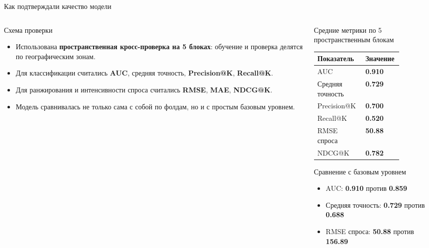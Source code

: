 \documentclass[aspectratio=169,12pt]{beamer}
\begin{document}
\begin{frame}[shrink=4]{Как подтверждали качество модели}
\footnotesize
\begin{columns}[T]
\begin{column}{0.54\textwidth}
\begin{block}{Схема проверки}
\begin{itemize}
\item Использована \textbf{пространственная кросс-проверка на 5 блоках}: обучение и проверка делятся по географическим зонам.
\item Для классификации считались \textbf{AUC}, средняя точность, \textbf{Precision@K}, \textbf{Recall@K}.
\item Для ранжирования и интенсивности спроса считались \textbf{RMSE}, \textbf{MAE}, \textbf{NDCG@K}.
\item Модель сравнивалась не только сама с собой по фолдам, но и с простым базовым уровнем.
\end{itemize}
\end{block}

\end{column}

\begin{column}{0.46\textwidth}
\begin{block}{Средние метрики по 5 пространственным блокам}
\centering
\begin{tabular}{>{\raggedright\arraybackslash}p{0.52\linewidth} >{\centering\arraybackslash}p{0.20\linewidth}}
\toprule
Показатель & Значение \\
\midrule
AUC & \textbf{0.910} \\
Средняя точность & \textbf{0.729} \\
Precision@K & \textbf{0.700} \\
Recall@K & \textbf{0.520} \\
RMSE спроса & \textbf{50.88} \\
NDCG@K & \textbf{0.782} \\
\bottomrule
\end{tabular}
\end{block}

\begin{block}{Сравнение с базовым уровнем}
\begin{itemize}
\item AUC: \textbf{0.910} против \textbf{0.859}
\item Средняя точность: \textbf{0.729} против \textbf{0.688}
\item RMSE спроса: \textbf{50.88} против \textbf{156.89}
\end{itemize}
\end{block}
\end{column}
\end{columns}
\end{frame}
\end{document}
